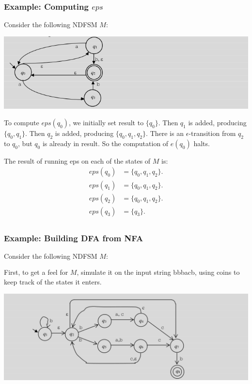 \documentclass[hidelinks,12pt]{article}
\begin{document}
\subsubsection{Example: Computing $eps$}

Consider the following NDFSM $M$:

\includegraphics[width=\linewidth]{./img/eps.png}

To compute $eps(q_0)$, we initially set result to $\{q_0\}$. Then $q_1$ is added, producing $\{q_0, q_1\}$. Then $q_2$ is added, producing
$\{q_0, q_1, q_2\}$. There is an $\epsilon$-transition from $q_2$ to $q_0$, but $q_0$ is already in result. So the computation of $e(q_0)$ halts.

The result of running eps on each of the states of $M$ is:
\begin{align*}
    eps(q_0)&= \{q_0, q_1, q_2\}.\\
    eps(q_1)&= \{q_0, q_1, q_2\}.\\
    eps(q_2)&= \{q_0, q_1, q_2\}.\\
    eps(q_3)&= \{q_3\}.\\
\end{align*}

\subsubsection{Example: Building DFA from NFA}

Consider the following NDFSM $M$:

First, to get a feel for $M$, simulate it on the input string bbbacb, using coins
to keep track of the states it enters.

\includegraphics[width=\linewidth]{./img/ndfsmtodfsm1.png}
\end{document}
